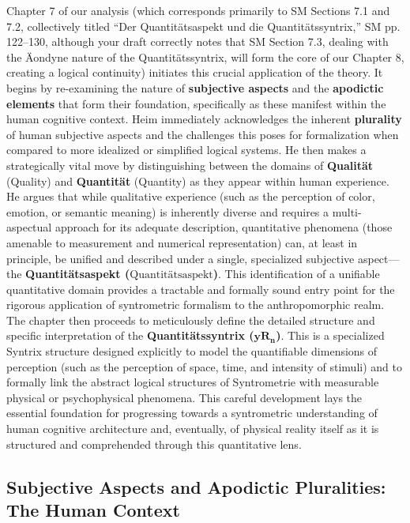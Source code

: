 \documentclass[12pt]{article}
\newcommand{\q}[1]{\enquote{#1}}
\newcommand{\quantitaetsaspekt}{\text{Quantitätsaspekt}}
\newcommand{\quantitaetssyntrix}{\bm{yR_n}}
\begin{document}
Chapter 7 of our analysis (which corresponds primarily to SM Sections 7.1 and 7.2, collectively titled \q{Der Quantitätsaspekt und die Quantitätssyntrix,} SM pp. 122–130, although your draft correctly notes that SM Section 7.3, dealing with the Äondyne nature of the Quantitätssyntrix, will form the core of our Chapter 8, creating a logical continuity) initiates this crucial application of the theory. It begins by re-examining the nature of \textbf{subjective aspects} and the \textbf{apodictic elements} that form their foundation, specifically as these manifest within the human cognitive context. Heim immediately acknowledges the inherent \textbf{plurality} of human subjective aspects and the challenges this poses for formalization when compared to more idealized or simplified logical systems. He then makes a strategically vital move by distinguishing between the domains of \textbf{Qualität} (Quality) and \textbf{Quantität} (Quantity) as they appear within human experience. He argues that while qualitative experience (such as the perception of color, emotion, or semantic meaning) is inherently diverse and requires a multi-aspectual approach for its adequate description, quantitative phenomena (those amenable to measurement and numerical representation) can, at least in principle, be unified and described under a single, specialized subjective aspect—the \textbf{Quantitätsaspekt (\(\quantitaetsaspekt\))}. This identification of a unifiable quantitative domain provides a tractable and formally sound entry point for the rigorous application of syntrometric formalism to the anthropomorphic realm. The chapter then proceeds to meticulously define the detailed structure and specific interpretation of the \textbf{Quantitätssyntrix (\(\quantitaetssyntrix\))}. This is a specialized Syntrix structure designed explicitly to model the quantifiable dimensions of perception (such as the perception of space, time, and intensity of stimuli) and to formally link the abstract logical structures of Syntrometrie with measurable physical or psychophysical phenomena. This careful development lays the essential foundation for progressing towards a syntrometric understanding of human cognitive architecture and, eventually, of physical reality itself as it is structured and comprehended through this quantitative lens.

\subsection{Subjective Aspects and Apodictic Pluralities: The Human Context}
\label{sec:subjective_aspects_pluralities}
\end{document}
